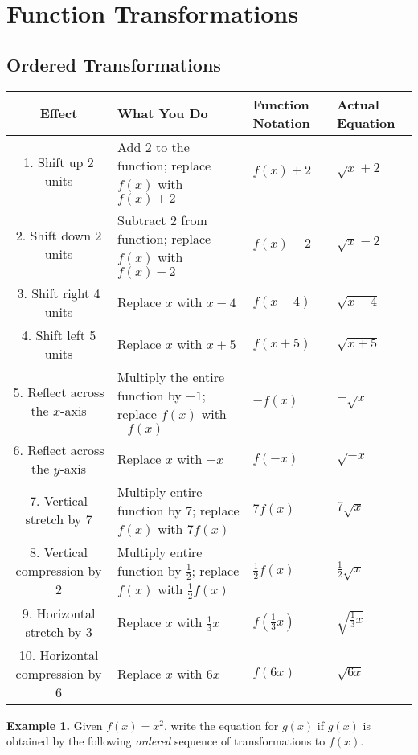 \chapter{Function Transformations}

\section{Ordered Transformations}

\begin{center}
\begin{tabular}{c|p{3.5in}|p{0.75in}|p{0.75in}}   
    \textbf{Effect} &  \textbf{What You Do} & \textbf{Function Notation} & \textbf{Actual Equation}  \\ \hline 
    1. Shift up 2 units & Add 2 to the function; replace $f(x)$ with $f(x)+2$ & $f(x) + 2$ & $\sqrt{x} + 2$ \\
    2. Shift down 2 units & Subtract 2 from function; replace $f(x)$ with $f(x)-2$ & $f(x) - 2$ & $\sqrt{x} - 2$  \\ \hline \hline 
    3. Shift right 4 units & Replace $x$ with $x-4$ & $f(x-4)$  & $\sqrt{x-4}$ \\
    4. Shift left 5 units & Replace $x$ with $x+5$ & $f(x+5)$ & $\sqrt{x+5}$ \\ \hline \hline 
    5. Reflect across the $x$-axis & Multiply the entire function by $-1$; replace $f(x)$ with $-f(x)$ & $-f(x)$ & $-\sqrt{x}$ \\
    6. Reflect across the $y$-axis & Replace $x$ with $-x$ & $f(-x)$ & $\sqrt{-x}$ \\ \hline \hline 
    7. Vertical stretch by 7 & Multiply entire function by 7; replace $f(x)$ with $7f(x)$ & $7f(x)$ & $7\sqrt{x}$ \\
    8. Vertical compression by 2 & Multiply entire function by $\frac{1}{2}$; replace $f(x)$ with $\frac{1}{2}f(x)$ & $\frac{1}{2}f(x)$ & $\frac{1}{2}\sqrt{x}$ \\ \hline \hline 
    9. Horizontal stretch by 3 & Replace $x$ with $\frac{1}{3}x$ & $f\left(\frac{1}{3}x\right)$ & $\sqrt{\frac{1}{3}x}$ \\ 
    10. Horizontal compression by 6 & Replace $x$ with $6x$ & $f(6x)$ & $\sqrt{6x}$ \\
\end{tabular}
\end{center}
\bigskip 

{\color{red}\textbf{Example 1.}} Given $f(x) = x^2$, write the equation for $g(x)$ if $g(x)$ is obtained by the following \emph{ordered} sequence of transformations to $f(x)$. \newline 


